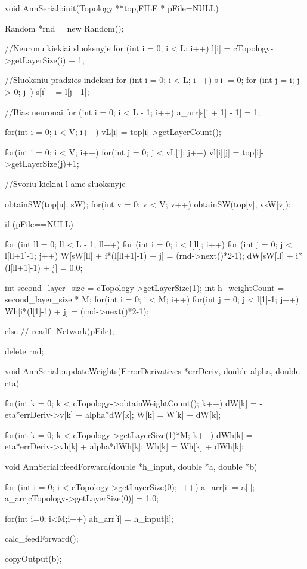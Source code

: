 void AnnSerial::init(Topology **top,FILE * pFile=NULL){

	Random *rnd = new Random();

	//Neuronu kiekiai sluoksnyje
	for (int i = 0; i < L; i++) {
		l[i] = cTopology->getLayerSize(i) + 1;
	}

	//Sluoksniu pradzios indeksai
	for (int i = 0; i < L; i++) {
		s[i] = 0;
		for (int j = i; j > 0; j--) {
			s[i] += l[j - 1];
		}
	}

	//Bias neuronai
	for (int i = 0; i < L - 1; i++) {
		a_arr[s[i + 1] - 1] = 1;
	}

  for(int i = 0; i < V; i++){
    vL[i] = top[i]->getLayerCount();
  }

  for(int i = 0; i < V; i++)
    for(int j = 0; j < vL[i]; j++)
      vl[i][j] = top[i]->getLayerSize(j)+1;


	//Svoriu kiekiai l-ame sluoksnyje


  obtainSW(top[u], sW);
  for(int v = 0; v < V; v++){
    obtainSW(top[v], vsW[v]);
  }


  if (pFile==NULL) {
    for (int ll = 0; ll < L - 1; ll++)
      for (int i = 0; i < l[ll]; i++)
        for (int j = 0; j < l[ll+1]-1; j++){
          W[sW[ll] + i*(l[ll+1]-1) + j] = (rnd->next()*2-1);
          dW[sW[ll] + i*(l[ll+1]-1) + j] = 0.0;
        }


    int second_layer_size = cTopology->getLayerSize(1);
    int h_weightCount = second_layer_size * M;
    for(int i = 0; i < M; i++)
      for(int j = 0; j < l[1]-1; j++)
        Wh[i*(l[1]-1) + j] = (rnd->next()*2-1);

  }
  else {
  //  readf_Network(pFile);
  }

  delete rnd;

}

void AnnSerial::updateWeights(ErrorDerivatives *errDeriv, double alpha, double eta){

  for(int k = 0; k < cTopology->obtainWeightCount(); k++){
    dW[k] = -eta*errDeriv->v[k] + alpha*dW[k];
    W[k] = W[k] + dW[k];
  }

  for(int k = 0; k < cTopology->getLayerSize(1)*M; k++){
    dWh[k] = -eta*errDeriv->vh[k] + alpha*dWh[k];
    Wh[k] = Wh[k] + dWh[k];
  }

}

void AnnSerial::feedForward(double *h_input, double *a, double *b){

  for (int i = 0; i < cTopology->getLayerSize(0); i++) {
    a_arr[i] = a[i];
  }
  a_arr[cTopology->getLayerSize(0)] = 1.0;

  for(int i=0; i<M;i++){
    ah_arr[i] = h_input[i];
  }

	calc_feedForward();

	copyOutput(b);
}

